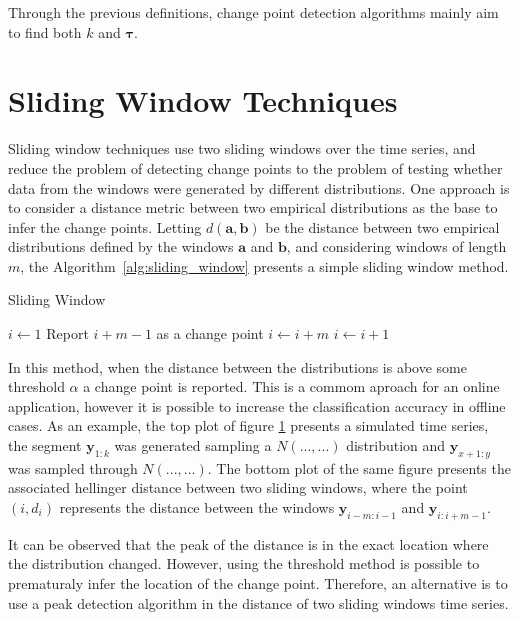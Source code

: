 Through the previous definitions, change point detection algorithms mainly aim to find both $k$ and $\boldsymbol \tau$.

\section{Sliding Window Techniques}

Sliding window techniques use two sliding windows over the time series, and reduce the problem of detecting change points to the problem of testing whether data from the windows were generated by different distributions. One approach is to consider a distance metric between two empirical distributions as the base to infer the change points. Letting $d(\mathbf{a}, \mathbf{b})$ be the distance between two empirical distributions defined by the windows $\mathbf{a}$ and $\mathbf{b}$, and considering windows of length $m$, the Algorithm~\ref{alg:sliding_window} presents a simple sliding window method.

\begin{algorithm}
    \caption{Sliding Window}
    \label{alg:sliding_window}
	\begin{algorithmic}[1]
		\State $i \gets 1$
                \State Report $i + m - 1$ as a change point
		        \State $i \gets i + m$
             \Else
		        \State $i \gets i + 1$
             \EndIf
        \EndWhile
	\end{algorithmic}
\end{algorithm}

In this method, when the distance between the distributions is above some threshold $\alpha$ a change point is reported. This is a commom aproach for an online application, however it is possible to increase the classification accuracy in offline cases. As an example, the top plot of figure \ref{} presents a simulated time series, the segment $\mathbf{y}_{1 : k}$ was generated sampling a $N(..., ...)$ distribution and $\mathbf{y}_{x + 1 : y}$ was sampled through $N(..., ...)$. The bottom plot of the same figure presents the associated hellinger distance between two sliding windows, where the point $(i, d_{i})$ represents the distance between the windows $\mathbf{y}_{i - m : i - 1}$ and $\mathbf{y}_{i : i + m - 1}$.

It can be observed that the peak of the distance is in the exact location where the distribution changed. However, using the threshold method is possible to prematuraly infer the location of the change point. Therefore, an alternative is to use a peak detection algorithm in the distance of two sliding windows time series.

